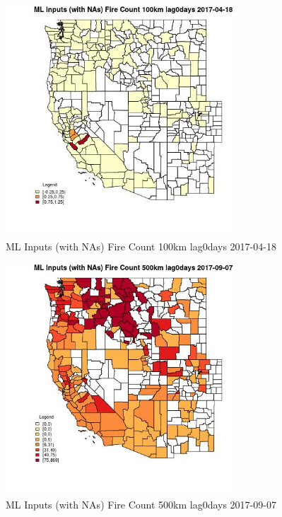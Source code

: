 \begin{figure} 
\centering  
\includegraphics[width=0.77\textwidth]{Code_Outputs/Report_ML_input_PM25_Step4_part_e_de_duplicated_aves_compiled_2019-05-20wNAs_CountyFire_Count_100km_lag0daysMean2017-04-18.jpg} 
\caption{\label{fig:Report_ML_input_PM25_Step4_part_e_de_duplicated_aves_compiled_2019-05-20wNAsCountyFire_Count_100km_lag0daysMean2017-04-18}ML Inputs (with NAs) Fire Count 100km lag0days 2017-04-18} 
\end{figure} 
 

\begin{figure} 
\centering  
\includegraphics[width=0.77\textwidth]{Code_Outputs/Report_ML_input_PM25_Step4_part_e_de_duplicated_aves_compiled_2019-05-20wNAs_CountyFire_Count_500km_lag0daysMean2017-09-07.jpg} 
\caption{\label{fig:Report_ML_input_PM25_Step4_part_e_de_duplicated_aves_compiled_2019-05-20wNAsCountyFire_Count_500km_lag0daysMean2017-09-07}ML Inputs (with NAs) Fire Count 500km lag0days 2017-09-07} 
\end{figure} 
 

